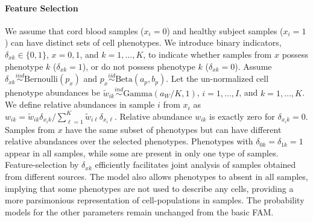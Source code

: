 \documentclass[12pt]{article} %
\newcommand{\G}{ \text{Gamma} }
\newcommand{\iid}{\overset{iid}{\sim}}
\newcommand{\ind}{\overset{ind}{\sim}}
\begin{document}
\paragraph*{Feature Selection} We assume that cord blood samples ($x_i=0$) and
healthy subject samples ($x_i=1$) can have distinct sets of cell phenotypes.
We introduce binary indicators, $\delta_{xk}\in \{0, 1\}$, $x=0,1$, and
$k=1,\ldots, K$, to indicate whether samples from $x$ possess phenotype $k$
($\delta_{xk}=1$), or do not possess phenotype $k$ ($\delta_{xk}=0$). Assume
$\delta_{xk} \ind \text{Bernoulli}(p_{x})$ and $p_x \iid \text{Beta}(a_p, b_p)$.  Let
the un-normalized cell phenotype abundances be $\tilde w_{ik} \ind \G(a_W/K,
1)$, $i=1, \ldots, I$, and $k=1, \ldots, K$. We define relative abundances in
sample $i$ from $x_i$ as 
$
w_{ik} =\tilde w_{ik} \delta_{x_i k}/\sum_{\ell=1}^K\tilde w_{i\ell} \delta_{x_i \ell}.
$
Relative abundance $w_{ik}$ is exactly zero for $\delta_{x_ik}=0$. Samples
from $x$ have the same subset of phenotypes but can have different relative
abundances over the selected phenotypes. Phenotypes with
$\delta_{0k}=\delta_{1k}=1$ appear in all samples, while some are present in only
one type of samples. Feature-selection by $\delta_{xk}$ efficiently facilitates
joint analysis of samples obtained from different sources. The model also
allows phenotypes to absent in all samples, implying that some phenotypes are not
used to describe any cells, providing a more parsimonious representation of 
cell-populations in samples. The probability models for the other parameters
remain unchanged from the basic FAM.



\end{document}
